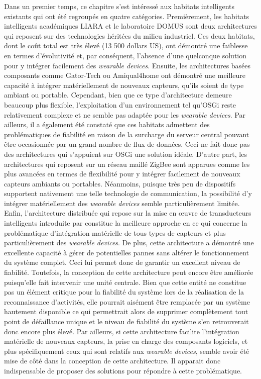Dans un premier temps, ce chapitre s'est intéressé aux habitats intelligents existants qui ont été regroupés en quatre catégories. Premièrement, les habitats intelligents académiques \acs{LIARA} et le laboratoire \acs{DOMUS} sont deux architectures qui reposent sur des technologies héritées du milieu industriel. Ces deux habitats, dont le coût total est très élevé (13 500 dollars US), ont démontré une faiblesse en termes d'évolutivité et, par conséquent, l'absence d'une quelconque solution pour y intégrer facilement des \textit{wearable devices}. Ensuite, les architectures basées composants comme Gator-Tech ou Amiqual4home ont démontré une meilleure capacité à intégrer matériellement de nouveaux capteurs, qu'ils soient de type ambiant ou portable. Cependant, bien que ce type d'architecture demeure beaucoup plus flexible, l'exploitation d'un environnement tel qu'\acs{OSGi} reste relativement complexe et ne semble pas adaptée pour les \textit{wearable devices}. Par ailleurs, il a également été constaté que ces habitats admettent des problématiques de fiabilité en raison de la surcharge du serveur central pouvant être occasionnée par un grand nombre de flux de données. Ceci ne fait donc pas des architectures qui s'appuient sur \acs{OSGi} une solution idéale. D'autre part, les architectures qui reposent sur un réseau maillé ZigBee sont apparues comme les plus avancées en termes de flexibilité pour y intégrer facilement de nouveaux capteurs ambiants ou portables. Néanmoins, puisque très peu de dispositifs supportent nativement une telle technologie de communication, la possibilité d'y intégrer matériellement des \textit{wearable devices} semble particulièrement limitée. Enfin, l'architecture distribuée qui repose sur la mise en \oe{}uvre de transducteurs intelligents introduite par \cite{Plantevin2018} constitue la meilleure approche en ce qui concerne la problématique d'intégration matérielle de tous types de capteurs et plus particulièrement des \textit{wearable devices}. De plus, cette architecture a démontré une excellente capacité à gérer de potentielles pannes sans altérer le fonctionnement du système complet. Ceci lui permet donc de garantir un excellent niveau de fiabilité. Toutefois, la conception de cette architecture peut encore être améliorée puisqu'elle fait intervenir une unité centrale. Bien que cette entité ne constitue pas un élément critique pour la fiabilité du système lors de la réalisation de la reconnaissance d'activités, elle pourrait aisément être remplacée par un système hautement disponible ce qui permettrait alors de supprimer complètement tout point de défaillance unique et le niveau de fiabilité du système s'en retrouverait donc encore plus élevé. Par ailleurs, si cette architecture facilite l'intégration matérielle de nouveaux capteurs, la prise en charge des composants logiciels, et plus spécifiquement ceux qui sont relatifs aux \textit{wearable devices}, semble avoir été mise de côté dans la conception de cette architecture. Il apparait donc indispensable de proposer des solutions pour répondre à cette problématique.

